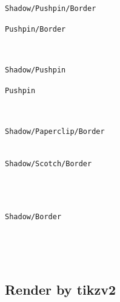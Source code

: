 \documentclass[english,a4paper,11pt]{article}
\begin{document}
\begin{DemoCode}
\hfill\begin{PostItNote}[Render=tikz]
\texttt{Shadow/Pushpin/Border}
\end{PostItNote}
\begin{PostItNote}[Shadow=false,Render=tikz]
\texttt{Pushpin/Border}
\end{PostItNote}\hfill~

\medskip

\hfill\begin{PostItNote}[Border=false,Render=tikz]
\texttt{Shadow/Pushpin}
\end{PostItNote}
\begin{PostItNote}[Border=false,Shadow=false,Render=tikz]
\texttt{Pushpin}
\end{PostItNote}\hfill~

\medskip

\hfill\begin{PostItNote}[Pin=Paperclip,Render=tikz]
\texttt{Shadow/Paperclip/Border}\\
~
\end{PostItNote}
\begin{PostItNote}[Pin=Scotch,Render=tikz]
\texttt{Shadow/Scotch/Border}\\
~
\end{PostItNote}\hfill~

\medskip

\hfill\begin{PostItNote}[Pin=None,Render=tikz]
\texttt{Shadow/Border}
\end{PostItNote}\hfill~

\vspace{1cm}

\hfill\begin{PostItNote}[Render=tikz,Title={Lipsum[1][1-4]},FontTitle={\large\sffamily},Rotate=5,Color=pink,Height=6cm,Pin=Scotch,AlignV=center,Corner]
\lipsum[1][1-4]
\end{PostItNote}\hfill~
\end{DemoCode}

\subsection{Render by tikzv2}
\end{document}
